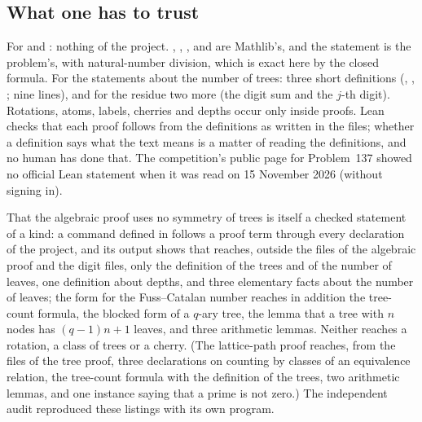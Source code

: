 \documentclass[11pt]{article}
\theoremstyle{definition}
\theoremstyle{remark}
\numberwithin{equation}{section}
\numberwithin{figure}{section}
\begin{document}
\subsection{What one has to trust}
For  and : nothing of the project.
, , ,  and  are
Mathlib's, and the statement is the problem's, with natural-number division, which is exact here by the
closed formula. For the statements about the number of trees: three short definitions (,
, ; nine lines), and for the residue two more (the digit sum and the
$j$-th digit). Rotations, atoms, labels, cherries and depths occur only inside proofs. Lean checks that each
proof follows from the definitions as written in the files; whether a definition says what the text means is
a matter of reading the definitions, and no human has done that. The competition's public page for
Problem~137 showed no official Lean statement when it was read on 15 November 2026 (without signing in).

That the algebraic proof uses no symmetry of trees is itself a checked statement of a kind: a command
defined in  follows a proof term through every declaration of the project, and
its output shows that  reaches, outside the files of the algebraic proof
and the digit files, only the definition of the trees and of the number of leaves, one definition about
depths, and three elementary facts about the number of leaves; the form for the Fuss--Catalan number reaches
in addition the tree-count formula, the blocked form of a $q$-ary tree, the lemma that a tree with $n$ nodes
has $(q-1)n+1$ leaves, and three arithmetic lemmas. Neither reaches a rotation, a class of trees or a cherry.
(The lattice-path proof reaches, from the files of the tree proof, three declarations on counting by classes
of an equivalence relation, the tree-count formula with the definition of the trees, two arithmetic lemmas,
and one instance saying that a prime is
not zero.) The independent audit reproduced these listings with its own program.
\end{document}
